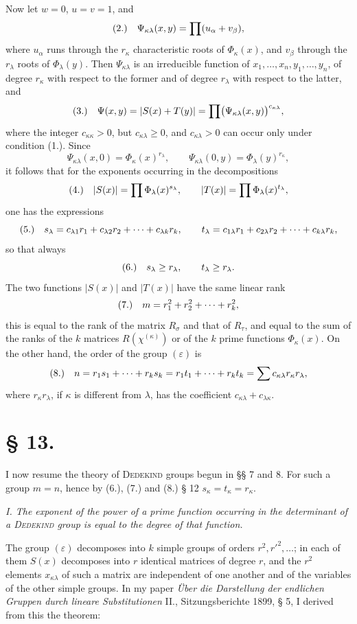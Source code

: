 \documentclass[11pt]{article}
\newcommand{\eps}{\varepsilon}
\newcommand{\fnum}[1]{\textup{(\ensuremath{#1}.)}\quad}
\begin{document}
Now let $w=0$, $u=v=1$, and
\[
\fnum{2} \Psi_{\kappa\lambda}(x,y)=\prod(u_\alpha+v_\beta),
\]
where $u_\alpha$ runs through the $r_\kappa$ characteristic roots of $\Phi_\kappa(x)$, and $v_\beta$ through the $r_\lambda$ roots of $\Phi_\lambda(y)$. Then $\Psi_{\kappa\lambda}$ is an irreducible function of $x_1,\ldots,x_n,y_1,\ldots,y_n$, of degree $r_\kappa$ with respect to the former and of degree $r_\lambda$ with respect to the latter, and
\[
\fnum{3} \Psi(x,y)=|S(x)+T(y)|=\prod\bigl(\Psi_{\kappa\lambda}(x,y)\bigr)^{c_{\kappa\lambda}},
\]
where the integer $c_{\kappa\kappa}>0$, but $c_{\kappa\lambda}\geq0$, and $c_{\kappa\lambda}>0$ can occur only under condition (1.). Since
\[
 \Psi_{\kappa\lambda}(x,0)=\Phi_\kappa(x)^{r_\lambda},
 \qquad
 \Psi_{\kappa\lambda}(0,y)=\Phi_\lambda(y)^{r_\kappa},
\]
it follows that for the exponents occurring in the decompositions
\[
\fnum{4} |S(x)|=\prod\Phi_\lambda(x)^{s_\lambda},
\qquad
|T(x)|=\prod\Phi_\lambda(x)^{t_\lambda},
\]
one has the expressions
\[
\fnum{5} s_\lambda=c_{\lambda1}r_1+c_{\lambda2}r_2+\cdots+c_{\lambda k}r_k,
\qquad
 t_\lambda=c_{1\lambda}r_1+c_{2\lambda}r_2+\cdots+c_{k\lambda}r_k,
\]
so that always
\[
\fnum{6} s_\lambda\geq r_\lambda,
\qquad t_\lambda\geq r_\lambda.
\]
The two functions $|S(x)|$ and $|T(x)|$ have the same linear rank
\[
\fnum{7} m=r_1^2+r_2^2+\cdots+r_k^2,
\]
this is equal to the rank of the matrix $R_\sigma$ and that of $R_\tau$, and equal to the sum of the ranks of the $k$ matrices $R(\chi^{(\kappa)})$ or of the $k$ prime functions $\Phi_\kappa(x)$. On the other hand, the order of the group $(\eps)$ is
\[
\fnum{8} n=r_1s_1+\cdots+r_ks_k=r_1t_1+\cdots+r_kt_k=\sum c_{\kappa\lambda}r_\kappa r_\lambda,
\]
where $r_\kappa r_\lambda$, if $\kappa$ is different from $\lambda$, has the coefficient $c_{\kappa\lambda}+c_{\lambda\kappa}$.

\section*{§ 13.}

I now resume the theory of \textsc{Dedekind} groups begun in §§ 7 and 8. For such a group $m=n$, hence by (6.), (7.) and (8.) § 12 $s_\kappa=t_\kappa=r_\kappa$.

\emph{I. The exponent of the power of a prime function occurring in the determinant of a \textsc{Dedekind} group is equal to the degree of that function.}

The group $(\eps)$ decomposes into $k$ simple groups of orders $r^2,r'^2,\ldots$; in each of them $S(x)$ decomposes into $r$ identical matrices of degree $r$, and the $r^2$ elements $x_{\kappa\lambda}$ of such a matrix are independent of one another and of the variables of the other simple groups. In my paper \emph{Über die Darstellung der endlichen Gruppen durch lineare Substitutionen} II., Sitzungsberichte 1899, § 5, I derived from this the theorem:
\end{document}
